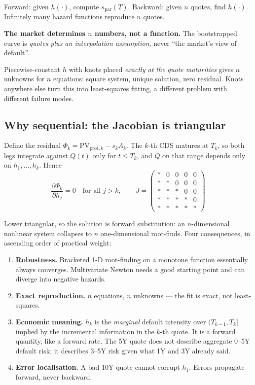 \documentclass[11pt,a4paper]{article}
\newcommand{\keypoint}[1]{%
  \par\vspace{0.4em}\noindent
  \colorbox{codebg}{\parbox{\dimexpr\linewidth-2\fboxsep}{\small #1}}%
  \par\vspace{0.5em}}
\begin{document}
Forward: given $h(\cdot)$, compute $s_{\text{par}}(T)$. Backward: given $n$ quotes, find
$h(\cdot)$. Infinitely many hazard functions reproduce $n$ quotes.

\keypoint{\textbf{The market determines $n$ numbers, not a function.} The bootstrapped curve
is \emph{quotes plus an interpolation assumption}, never ``the market's view of default''.}

Piecewise-constant $h$ with knots placed \emph{exactly at the quote maturities} gives $n$
unknowns for $n$ equations: square system, unique solution, zero residual. Knots anywhere else
turn this into least-squares fitting, a different problem with different failure modes.

\subsection{Why sequential: the Jacobian is triangular}

Define the residual $\Phi_k = \text{PV}_{\text{prot},k} - s_k A_k$. The $k$-th CDS matures at
$T_k$, so both legs integrate against $Q(t)$ only for $t \le T_k$, and $Q$ on that range
depends only on $h_1,\dots,h_k$. Hence
\[
\frac{\partial \Phi_k}{\partial h_j} = 0 \quad \text{for all } j > k,
\qquad
J = \begin{pmatrix}
\ast & 0 & 0 & 0 & 0\\
\ast & \ast & 0 & 0 & 0\\
\ast & \ast & \ast & 0 & 0\\
\ast & \ast & \ast & \ast & 0\\
\ast & \ast & \ast & \ast & \ast
\end{pmatrix}
\]

Lower triangular, so the solution is forward substitution: an $n$-dimensional nonlinear
system collapses to $n$ one-dimensional root-finds. Four consequences, in ascending order of
practical weight:

\begin{enumerate}[leftmargin=1.4em,itemsep=0.25em]
\item \textbf{Robustness.} Bracketed 1-D root-finding on a monotone function essentially
always converges. Multivariate Newton needs a good starting point and can diverge into
negative hazards.
\item \textbf{Exact reproduction.} $n$ equations, $n$ unknowns --- the fit is exact, not
least-squares.
\item \textbf{Economic meaning.} $h_k$ is the \emph{marginal} default intensity over
$(T_{k-1},T_k]$ implied by the incremental information in the $k$-th quote. It is a forward
quantity, like a forward rate. The 5Y quote does not describe aggregate 0--5Y default risk;
it describes 3--5Y risk given what 1Y and 3Y already said.
\item \textbf{Error localisation.} A bad 10Y quote cannot corrupt $h_1$. Errors propagate
forward, never backward.
\end{enumerate}
\end{document}
